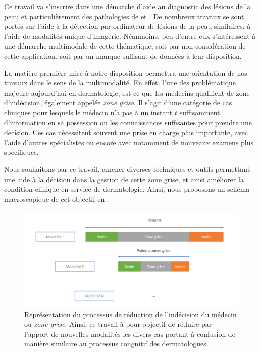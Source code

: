 \renewcommand{\thechapter}{\roman{chapter}}
\setcounter{chapter}{2}

\label{chap:preamble_context}

Ce travail va s'inscrire dans une démarche d'aide au diagnostic des lésions de la peau et particulièrement des pathologies de  et . De nombreux travaux se sont portés sur l'aide à la détection par ordinateur de lésions de la peau similaires, à l'aide de modalités unique d'imagerie. Néanmoins, peu d'entre eux s'intéressent à une démarche multimodale de cette thématique, soit par non considération de cette application, soit par un manque suffisant de données à leur disposition.\par

La matière première mise à notre disposition permettra une orientation de nos travaux dans le sens de la multimodalité. En effet, l'une des problématique majeure aujourd'hui en dermatologie, est ce que les médecins qualifient de zone d'indécision, également appelée \textit{zone grise}. Il s'agit d'une catégorie de cas cliniques pour lesquels le médecin n'a pas à un instant $t$ suffisamment d'information en sa possession ou les connaissances suffisantes pour prendre une décision. Ces cas nécessitent souvent une prise en charge plus importante, avec l'aide d'autres spécialistes ou encore avec notamment de nouveaux examens plus spécifiques.\par

Nous souhaitons par ce travail, amener diverses techniques et outils permettant une aide à la décision dans la gestion de cette zone grise, et ainsi améliorer la condition clinique en service de dermatologie. Ainsi, nous proposons un schéma macroscopique de cet objectif en .\par

\begin{figure}[H]
    \centering
    \includegraphics[width=\linewidth]{contents/ii_preamble_context/resources/scheme_reduce_indecision.pdf}
    \caption{Représentation du processus de réduction de l'indécision du médecin ou \textit{zone grise}. Ainsi, ce travail à pour objectif de réduire par l'apport de nouvelles modalités les divers cas portant à confusion de manière similaire au processus congnitif des dermatologues.}
    \label{fig:scheme_reduce_indecision}
\end{figure}\par

